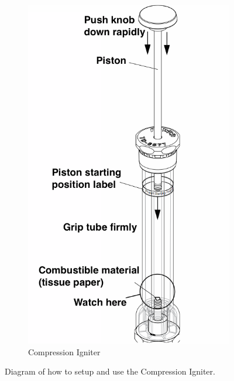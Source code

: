 \begin{figure}
\begin{subfigure}{0.48\textwidth}
	\includegraphics[width=0.9\linewidth]{./Exp1-11/pic/adiabignite}
	\caption{Compression Igniter}
\end{subfigure}
\caption{Diagram of how to setup and use the Compression Igniter.}
\label{adiabapp}
\end{figure}

